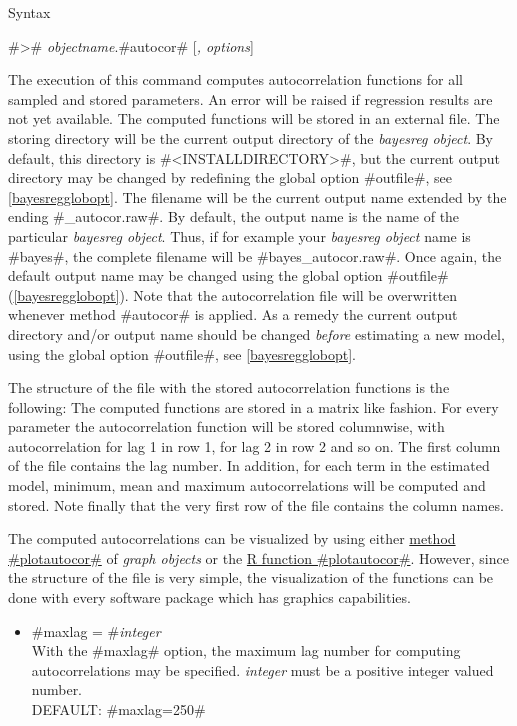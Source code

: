 \begin{stanza}{Syntax}

#># {\em objectname}.#autocor# [{\em , options}]

The execution of this command computes autocorrelation functions
for all sampled and stored parameters. An error
 will be raised
if regression results are not yet available. The computed
functions will be stored in an external file. The storing
directory will be the current output directory of the {\em
bayesreg object}. By default, this directory is
#<INSTALLDIRECTORY>\output#, but the current output
directory may be changed by redefining the global option
#outfile#, see \autoref{bayesregglobopt}. The filename will be
the current output name extended by the ending #_autocor.raw#. By
default, the output name is the name of the particular {\em
bayesreg object}. Thus, if for example your {\em bayesreg object}
 name is #bayes#, the complete
filename will be #bayes_autocor.raw#. Once again, the  default
output name may be changed using the global option #outfile#
(\autoref{bayesregglobopt}). Note that the autocorrelation file
will be overwritten whenever method #autocor# is applied. As a
remedy the current output directory and/or output name should be
changed {\em before} estimating a new model, using the global
option #outfile#, see \autoref{bayesregglobopt}.

The structure of the file with the stored autocorrelation
functions is the following: The computed functions are stored in a
matrix like fashion. For every parameter the autocorrelation
function will be stored columnwise, with autocorrelation for lag 1
in row 1, for lag 2 in row 2 and so on. The first column of the
file contains the lag number. In addition, for each term in the
estimated model, minimum, mean and maximum autocorrelations will
be computed and stored. Note finally that the very first row of
the file contains the column names.

The computed autocorrelations can be visualized by using either
\hyperref[graphplotautocor]{method #plotautocor#} of {\em graph
objects} or the \hyperref[rpackage]{R function
#plotautocor#}. However, since the structure of the file is very
simple, the visualization of the functions can be done with every
software package which has graphics capabilities.
\end{stanza}


\begin{itemize}
\item  #maxlag = #{\em integer } \\
With the #maxlag# option, the maximum lag number for computing
autocorrelations may be specified.
{\em integer} must be a positive integer valued number. \\
DEFAULT: #maxlag=250#
\end{itemize}


